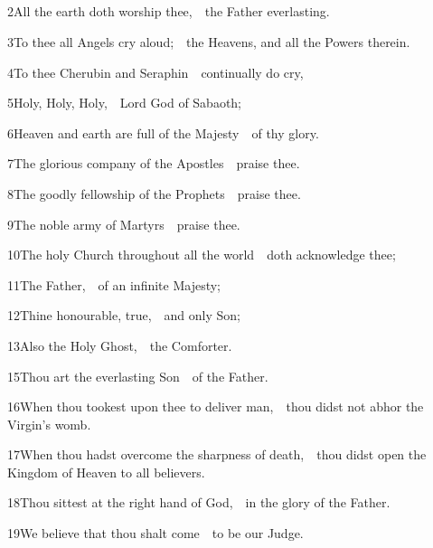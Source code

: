 \medskip


\subsection{}

2\enspace All the earth doth worship thee,\ \star\ the Father everlasting.

3\enspace To thee all Angels cry aloud;\ \star\ the Heavens, and all the Powers therein.

4\enspace To thee Cherubin and Seraphin\ \star\ continually do cry,

5\enspace Holy, Holy, Holy,\ \star\ Lord God of Sabaoth;

6\enspace Heaven and earth are full of the Majesty\ \star\ of thy glory.

7\enspace The glorious company of the Apostles\ \star\ praise thee.

8\enspace The goodly fellowship of the Prophets\ \star\ praise thee.

9\enspace The noble army of Martyrs\ \star\ praise thee.

10\enspace The holy Church throughout all the world\ \star\ doth acknowledge thee;

11\enspace The Father,\ \star\ of an infinite Majesty;

12\enspace Thine honourable, true,\ \star\ and only Son;

13\enspace Also the Holy Ghost,\ \star\ the Comforter.



15\enspace Thou art the everlasting Son\ \star\ of the Father.

16\enspace When thou tookest upon thee to deliver man,\ \star\ thou didst not abhor the Virgin’s womb.

17\enspace When thou hadst overcome the sharpness of death,\ \star\ thou didst open the Kingdom of Heaven to all believers.

18\enspace Thou sittest at the right hand of God,\ \star\ in the glory of the Father.

19\enspace We believe that thou shalt come\ \star\ to be our Judge.

